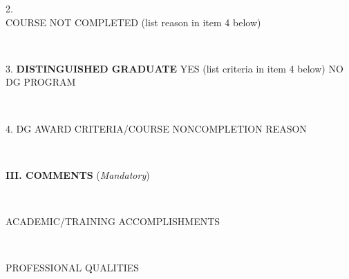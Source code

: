 \documentclass{article}
\begin{document}
\parbox[][\rhXI][c]{0.5\textwidth}{

2. \\[5pt]
\hspace{20pt}\hspace{25pt} \small COURSE NOT COMPLETED (list reason in item 4 below)
}\\
\hline
\parbox[][\rhXII][c]{\textwidth}{

3. \hspace{20pt} \textbf{DISTINGUISHED GRADUATE}\hspace{20pt}
\hspace{20pt} \small YES \hspace{20pt} (list criteria in item 4 below)\hspace{20pt}
\hspace{20pt} \small NO DG PROGRAM
}\\
\hline
\parbox[][\rhXIII][c]{\textwidth}{

4. DG AWARD CRITERIA/COURSE NONCOMPLETION REASON\\[1pt]
}\\
\hline
\parbox[][\rhXIV][c]{\textwidth}{

\textbf{III. COMMENTS} (\textit{Mandatory})
}\\
\hline
\parbox[][\rhXV][c]{\textwidth}{
ACADEMIC/TRAINING ACCOMPLISHMENTS\\[1pt]
}\\
\hline
\parbox[][\rhXVI][c]{\textwidth}{
PROFESSIONAL QUALITIES\\[1pt]
}\\
\end{document}
